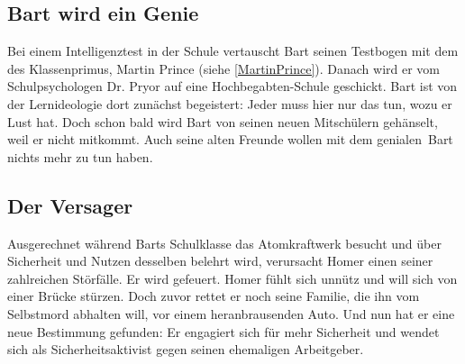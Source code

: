 \subsection{Bart wird ein Genie}\label{7G02}
Bei einem Intelligenztest in der Schule vertauscht Bart seinen Testbogen mit dem des Klassenprimus, Martin Prince (siehe \ref{MartinPrince}). Danach wird er vom Schulpsychologen Dr. Pryor auf eine Hochbegabten-Schule geschickt. Bart ist von der Lernideologie dort zunächst begeistert: Jeder muss hier nur das tun, wozu er Lust hat. Doch schon bald wird Bart von seinen neuen Mitschülern gehänselt, weil er nicht mitkommt. Auch seine alten Freunde wollen mit dem \glqq genialen\grqq\ Bart nichts mehr zu tun haben.


\subsection{Der Versager}\label{7G03}
Ausgerechnet während Barts Schulklasse das Atomkraftwerk besucht und über Sicherheit und Nutzen desselben belehrt wird, verursacht Homer einen seiner zahlreichen Störfälle. Er wird gefeuert. Homer fühlt sich unnütz und will sich von einer Brücke stürzen. Doch zuvor rettet er noch seine Familie, die ihn vom Selbstmord abhalten will, vor einem heranbrausenden Auto. Und nun hat er eine neue Bestimmung gefunden: Er engagiert sich für mehr Sicherheit und wendet sich als Sicherheitsaktivist gegen seinen ehemaligen Arbeitgeber.

